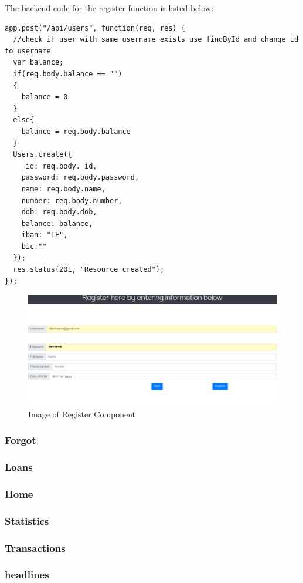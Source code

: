The backend code for the register function is listed below:
\begin{verbatim}
app.post("/api/users", function(req, res) {
  //check if user with same username exists use findById and change id to username
  var balance;
  if(req.body.balance == "")
  {
    balance = 0
  }
  else{
    balance = req.body.balance
  }
  Users.create({
    _id: req.body._id,
    password: req.body.password,
    name: req.body.name,
    number: req.body.number,
    dob: req.body.dob,
    balance: balance,
    iban: "IE",
    bic:""
  });
  res.status(201, "Resource created");
});
\end{verbatim}
\begin{figure}[h!b]
\includegraphics[width=\textwidth]{img/registercomponent.png}
\caption{Image of Register Component}
\label{fig:Image of register component}
\end{figure}
\subsubsection{Forgot}
\subsubsection{Loans}
\subsubsection{Home}
\subsubsection{Statistics}
\subsubsection{Transactions}
\subsubsection{headlines}
